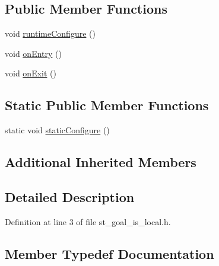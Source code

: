 \subsection*{Public Member Functions}
\begin{DoxyCompactItemize}
\item 
void \hyperlink{structsm__pr2__plugs_1_1StGoalIsLocal_aeddacc72a9eefe2a51d24564874f1610}{runtime\+Configure} ()
\item 
void \hyperlink{structsm__pr2__plugs_1_1StGoalIsLocal_a24c721242f553176d7af47e2c41077e0}{on\+Entry} ()
\item 
void \hyperlink{structsm__pr2__plugs_1_1StGoalIsLocal_aeb178f881033ed86b26ab4543ba05bad}{on\+Exit} ()
\end{DoxyCompactItemize}
\subsection*{Static Public Member Functions}
\begin{DoxyCompactItemize}
\item 
static void \hyperlink{structsm__pr2__plugs_1_1StGoalIsLocal_a7fde75ffa3d95e2f5153c35596817ab4}{static\+Configure} ()
\end{DoxyCompactItemize}
\subsection*{Additional Inherited Members}


\subsection{Detailed Description}


Definition at line 3 of file st\+\_\+goal\+\_\+is\+\_\+local.\+h.



\subsection{Member Typedef Documentation}
\mbox{\label{structsm__pr2__plugs_1_1StGoalIsLocal_a5e2307f3b40c73716bdb763e1d92dce2}} 

